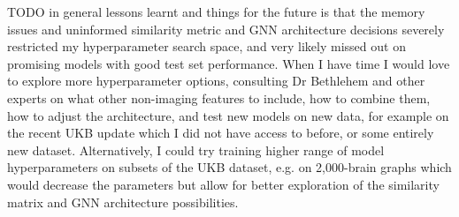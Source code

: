 TODO in general lessons learnt and things for the future is that the memory issues and uninformed similarity metric and GNN architecture decisions severely restricted my hyperparameter search space, and very likely missed out on promising models with good test set performance. When I have time I would love to explore more hyperparameter options, consulting Dr Bethlehem and other experts on what other non-imaging features to include, how to combine them, how to adjust the architecture, and test new models on new data, for example on the recent UKB update which I did not have access to before, or some entirely new dataset. Alternatively, I could try training higher range of model hyperparameters on subsets of the UKB dataset, e.g. on 2,000-brain graphs which would decrease the parameters but allow for better exploration of the similarity matrix and GNN architecture possibilities.
